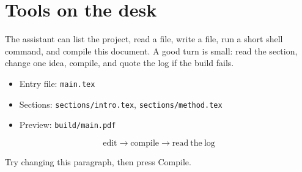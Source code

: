 \section{Tools on the desk}

The assistant can list the project, read a file, write a file, run a
short shell command, and compile this document. A good turn is small:
read the section, change one idea, compile, and quote the log if the
build fails.

\begin{itemize}
  \item Entry file: \texttt{main.tex}
  \item Sections: \texttt{sections/intro.tex}, \texttt{sections/method.tex}
  \item Preview: \texttt{build/main.pdf}
\end{itemize}

\[
  \mathrm{edit}
  \rightarrow
  \mathrm{compile}
  \rightarrow
  \mathrm{read\ the\ log}
\]

Try changing this paragraph, then press Compile.
